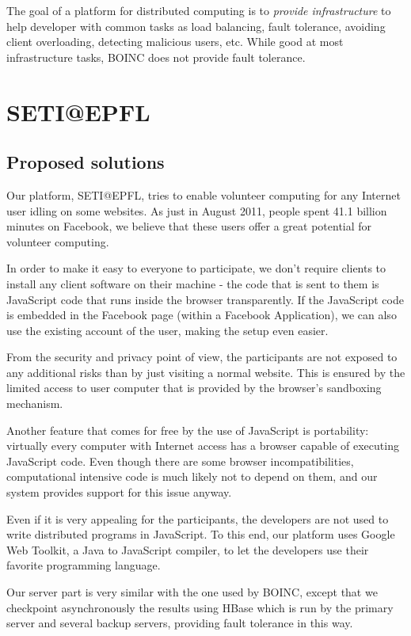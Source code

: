 \documentclass[letterpaper,twocolumn,10pt]{article}
\begin{document}
The goal of a platform for distributed computing is to {\it provide
infrastructure} to help developer with common tasks as load balancing,
fault tolerance, avoiding client overloading, detecting malicious users, etc.
While good at most infrastructure tasks, BOINC does not provide fault tolerance.

\section{SETI@EPFL} \label{seti_epfl}
\subsection{Proposed solutions}

Our platform, SETI@EPFL, tries to enable volunteer computing for any
Internet user idling on some websites. As just in August 2011, people spent 
41.1 billion minutes on Facebook, we believe that these users offer a great
potential for volunteer computing. 

In order to make it easy to everyone to participate, we don't require clients to
install any client software on their machine - the code that is sent to them is
JavaScript code that runs inside the browser transparently. If the JavaScript
code is embedded in the Facebook page (within a Facebook Application), we can
also use the existing account of the user, making the setup even easier. 

From the security and privacy point of view, the participants are not exposed to
any additional risks than by just visiting a normal website. This is ensured by
the limited access to user computer that is provided by the browser's sandboxing
mechanism.

Another feature that comes for free by the use of JavaScript is portability:
virtually every computer with Internet access has a browser capable of executing
JavaScript code. Even though there are some browser incompatibilities,
computational intensive code is much likely not to depend on them, and our
system provides support for this issue anyway. 

Even if it is very appealing for the participants, the developers are not used
to write distributed programs in JavaScript. To this end, our platform uses
Google Web Toolkit\cite{gwt}, a Java\cite{jvm} to JavaScript compiler, to let
the developers use their favorite programming language.

Our server part is very similar with the one used by BOINC, except that we
checkpoint asynchronously the results using HBase which is run by the primary
server and several backup servers, providing fault tolerance in this way.
\end{document}
